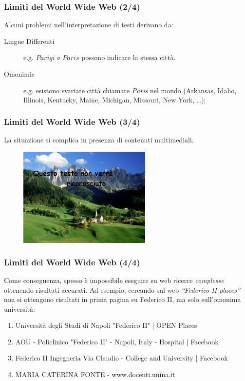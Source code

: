 \documentclass[8pt]{beamer}
\begin{document}
\begin{frame}
\frametitle{Limiti del World Wide Web (2/4)}
Alcuni problemi nell'interpretazione di testi derivano da:
\begin{description}
 \item[Lingue Differenti] e.g. $Parigi$ e $Paris$ possono indicare la stessa citt\`a.
 \item[Omonimie] e.g. esistono svariate citt\`a chiamate 
 \emph{Paris} nel mondo (Arkansas, Idaho, Illinois, Kentucky,
 Maine, Michigan, Missouri, New York, \ldots);
\end{description}
\end{frame}

\begin{frame}
\frametitle{Limiti del World Wide Web (3/4)}

La situazione si complica in presenza di contenuti multimediali.

\begin{figure}
    \includegraphics[width=250px]{unrecognizable.jpg} 
\end{figure}
\end{frame}

\begin{frame}
\frametitle{Limiti del World Wide Web (4/4)}
Come conseguenza, spesso \`e impossibile eseguire su web ricerce 
\emph{complesse} ottenendo risultati accurati. Ad esempio, cercando sul web
\emph{``Federico II places''} non si ottengono risultati in prima pagina su 
Federico II, ma solo sull'omonima universit\`a:
  
  \begin{small}
    \begin{enumerate}
   \item Universit\`a degli Studi di Napoli "Federico II" | OPEN Places
   \item AOU - Policlinico "Federico II" - Napoli, Italy - Hospital | Facebook
   \item Federico II Ingegneria Via Claudio - College and University | Facebook
   \item MARIA CATERINA FONTE - www.docenti.unina.it
  \end{enumerate}
  \end{small}
\end{frame}
\end{document}
